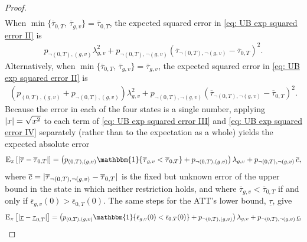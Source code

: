 \documentclass[twoside,11pt]{article}
\begin{document}
\begin{proof}
\begin{equation}
\begin{split}
\end{split}
\end{equation}
When $\min\{\overline{\tau}_{0,T}, \, \overline{\tau}_{g,v}\} = \overline{\tau}_{0,T}$, the expected squared error in \eqref{eq: UB exp squared error II} is 
\begin{equation} \label{eq: UB exp squared error III}
\begin{split}
p_{\neg(0,T),(g,v)} \lambda_{g,v}^2 + p_{\neg(0,T),\neg(g,v)} \left(\overline{\tau}_{\neg(0,T),\neg(g,v)} - \overline{\tau}_{0,T}\right)^2.
\end{split}
\end{equation}
Alternatively, when $\min\{\overline{\tau}_{0,T}, \, \overline{\tau}_{g,v}\} = \overline{\tau}_{g,v}$, the expected squared error in \eqref{eq: UB exp squared error II} is 
\begin{equation} \label{eq: UB exp squared error IV}
\begin{split}
\left(p_{(0,T),(g,v)} + p_{\neg(0,T),(g,v)}\right) \lambda_{g,v}^2 + p_{\neg(0,T),\neg(g,v)} \left(\overline{\tau}_{\neg(0,T),\neg(g,v)} - \overline{\tau}_{0,T}\right)^2.
\end{split}
\end{equation}
Because the error in each of the four states is a single number, applying $\lvert x\rvert = \sqrt{x^2}$ to each term of \eqref{eq: UB exp squared error III} and \eqref{eq: UB exp squared error IV} separately (rather than to the expectation as a whole) yields the expected absolute error
\begin{align*}
\E_{\pi}\left[\abs{\overline{\tau} - \overline{\tau}_{0,T}}\right] = \left(p_{(0,T),(g,v)} \mathbbm{1}\{\overline{\tau}_{g,v} < \overline{\tau}_{0,T}\} + p_{\neg(0,T),(g,v)}\right) \lambda_{g,v} + p_{\neg(0,T),\neg(g,v)} \, \overline{c},
\end{align*}
where $\overline{c} = \lvert\overline{\tau}_{\neg(0,T),\neg(g,v)} - \overline{\tau}_{0,T}\rvert$ is the fixed but unknown error of the upper bound in the state in which neither restriction holds, and where $\overline{\tau}_{g,v} < \overline{\tau}_{0,T}$ if and only if $\bar{\epsilon}_{g,v}(0) > \bar{\epsilon}_{0,T}(0)$. The same steps for the \textrm{ATT}'s lower bound, $\underline{\tau}$, give
\begin{align*}
\E_{\pi}\left[\abs{\underline{\tau} - \underline{\tau}_{0,T}}\right] = \left(p_{(0,T),(g,v)} \mathbbm{1}\{\bar{\epsilon}_{g,v}(0) < \bar{\epsilon}_{0,T}(0)\} + p_{\neg(0,T),(g,v)}\right) \lambda_{g,v} + p_{\neg(0,T),\neg(g,v)} \, \underline{c},
\end{align*}

\end{proof}
\end{document}
